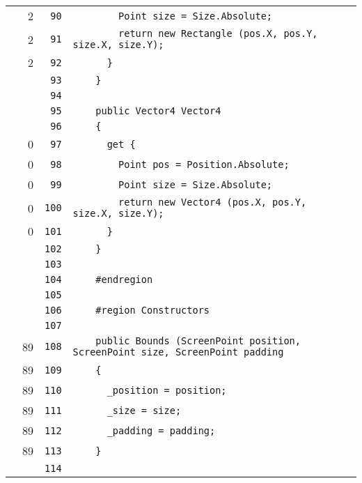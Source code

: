 \documentclass[a4paper,10pt]{article}
\begin{document}
\begin{longtable}[l]{lrrl}
\cellcolor{green} & 2 & \verb~90~ & \verb~        Point size = Size.Absolute;~\\
\cellcolor{green} & 2 & \verb~91~ & \verb~        return new Rectangle (pos.X, pos.Y, size.X, size.Y);~\\
\cellcolor{green} & 2 & \verb~92~ & \verb~      }~\\
\cellcolor{gray} &  & \verb~93~ & \verb~    }~\\
\cellcolor{gray} &  & \verb~94~ & \verb~~\\
\cellcolor{gray} &  & \verb~95~ & \verb~    public Vector4 Vector4~\\
\cellcolor{gray} &  & \verb~96~ & \verb~    {~\\
\cellcolor{red} & 0 & \verb~97~ & \verb~      get {~\\
\cellcolor{red} & 0 & \verb~98~ & \verb~        Point pos = Position.Absolute;~\\
\cellcolor{red} & 0 & \verb~99~ & \verb~        Point size = Size.Absolute;~\\
\cellcolor{red} & 0 & \verb~100~ & \verb~        return new Vector4 (pos.X, pos.Y, size.X, size.Y);~\\
\cellcolor{red} & 0 & \verb~101~ & \verb~      }~\\
\cellcolor{gray} &  & \verb~102~ & \verb~    }~\\
\cellcolor{gray} &  & \verb~103~ & \verb~~\\
\cellcolor{gray} &  & \verb~104~ & \verb~    #endregion~\\
\cellcolor{gray} &  & \verb~105~ & \verb~~\\
\cellcolor{gray} &  & \verb~106~ & \verb~    #region Constructors~\\
\cellcolor{gray} &  & \verb~107~ & \verb~~\\
\cellcolor{green} & 89 & \verb~108~ & \verb~    public Bounds (ScreenPoint position, ScreenPoint size, ScreenPoint padding~\\
\cellcolor{green} & 89 & \verb~109~ & \verb~    {~\\
\cellcolor{green} & 89 & \verb~110~ & \verb~      _position = position;~\\
\cellcolor{green} & 89 & \verb~111~ & \verb~      _size = size;~\\
\cellcolor{green} & 89 & \verb~112~ & \verb~      _padding = padding;~\\
\cellcolor{green} & 89 & \verb~113~ & \verb~    }~\\
\cellcolor{gray} &  & \verb~114~ & \verb~~\\

\end{longtable}
\end{document}
